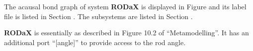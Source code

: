 
%

   The acausal bond graph of system \textbf{RODaX} is
   displayed in Figure  and its label
   file is listed in Section .
   The subsystems are listed in Section .

{\bf RODaX} is essentially as described in Figure 10.2 of
``Metamodelling''. It has an additional port ``[angle]'' to provide
access to the rod angle.

